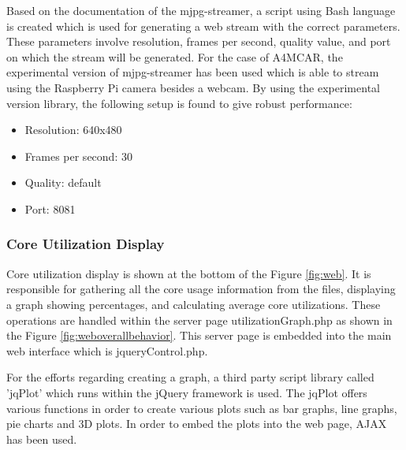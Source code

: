Based on the documentation of the mjpg-streamer, a script using Bash language is created which is used for generating a web stream with the correct parameters. These parameters involve resolution, frames per second, quality value, and port on which the stream will be generated. For the case of A4MCAR, the experimental version of mjpg-streamer has been used which is able to stream using the Raspberry Pi camera besides a webcam. By using the experimental version library, the following setup is found to give robust performance:
\begin{itemize}
	\item Resolution:        640x480
	\item Frames per second: 30
	\item Quality:           default
	\item Port:              8081
\end{itemize}
\subsubsection{Core Utilization Display}
Core utilization display is shown at the bottom of the Figure \ref{fig:web}. It is responsible for gathering all the core usage information from the files, displaying a graph showing percentages, and calculating average core utilizations. These operations are handled within the server page utilizationGraph.php as shown in the Figure \ref{fig:weboverallbehavior}. This server page is embedded into the main web interface which is jqueryControl.php.

For the efforts regarding creating a graph, a third party script library called 'jqPlot' \cite{jqplot} which runs within the jQuery framework is used.  The jqPlot offers various functions in order to create various plots such as bar graphs, line graphs, pie charts and 3D plots. In order to embed the plots into the web page, AJAX has been used.

